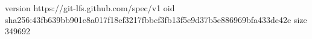 version https://git-lfs.github.com/spec/v1
oid sha256:43fb639bb901e8a017f18ef3217fbbcf3fb13f5e9d37b5e886969bfa433de42e
size 349692
